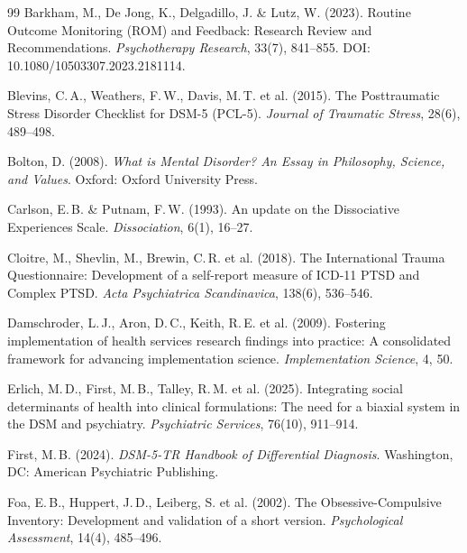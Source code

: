 \documentclass[11pt,a4paper]{article}
\begin{document}
\begin{thebibliography}{99}
Barkham, M., De Jong, K., Delgadillo, J. \& Lutz, W. (2023).
\newblock Routine Outcome Monitoring (ROM) and Feedback: Research Review and Recommendations.
\newblock \textit{Psychotherapy Research}, 33(7), 841--855. DOI: 10.1080/10503307.2023.2181114.

Blevins, C.\,A., Weathers, F.\,W., Davis, M.\,T. et al. (2015).
\newblock The Posttraumatic Stress Disorder Checklist for DSM-5 (PCL-5).
\newblock \textit{Journal of Traumatic Stress}, 28(6), 489--498.

Bolton, D. (2008).
\newblock \textit{What is Mental Disorder? An Essay in Philosophy, Science, and Values}.
\newblock Oxford: Oxford University Press.

Carlson, E.\,B. \& Putnam, F.\,W. (1993).
\newblock An update on the Dissociative Experiences Scale.
\newblock \textit{Dissociation}, 6(1), 16--27.

Cloitre, M., Shevlin, M., Brewin, C.\,R. et al. (2018).
\newblock The International Trauma Questionnaire: Development of a self-report measure of ICD-11 PTSD and Complex PTSD.
\newblock \textit{Acta Psychiatrica Scandinavica}, 138(6), 536--546.

Damschroder, L.\,J., Aron, D.\,C., Keith, R.\,E. et al. (2009).
\newblock Fostering implementation of health services research findings into practice: A consolidated framework for advancing implementation science.
\newblock \textit{Implementation Science}, 4, 50.

Erlich, M.\,D., First, M.\,B., Talley, R.\,M. et al. (2025).
\newblock Integrating social determinants of health into clinical formulations: The need for a biaxial system in the DSM and psychiatry.
\newblock \textit{Psychiatric Services}, 76(10), 911--914.

First, M.\,B. (2024).
\newblock \textit{DSM-5-TR Handbook of Differential Diagnosis}.
\newblock Washington, DC: American Psychiatric Publishing.

Foa, E.\,B., Huppert, J.\,D., Leiberg, S. et al. (2002).
\newblock The Obsessive-Compulsive Inventory: Development and validation of a short version.
\newblock \textit{Psychological Assessment}, 14(4), 485--496.


\end{thebibliography}
\end{document}
